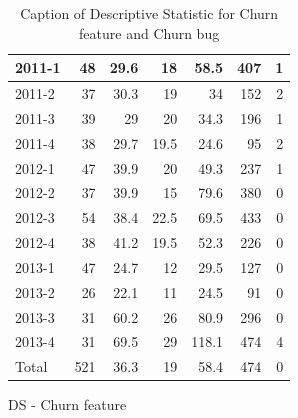 \documentclass[UKenglish]{ifimaster}  %
\begin{document}
\begin{appendices}
\begin{table}[!htbp]
\begin{adjustwidth}{-1.5cm}{}
\begin{subfigure}[b]{0.3\textwidth}
{\begin{tabular}{ | l | r | r | r | r | r | r | }
 2011-1  & 48 & 29.6 & 18 & 58.5 & 407 & 1 \\ \hline
 2011-2  & 37 & 30.3 & 19 & 34 & 152 & 2 \\ \hline
 2011-3  & 39 & 29 & 20 & 34.3 & 196 & 1 \\ \hline
 2011-4  & 38 & 29.7 & 19.5 & 24.6 & 95 & 2 \\ \hline
 2012-1  & 47 & 39.9 & 20 & 49.3 & 237 & 1 \\ \hline
 2012-2  & 37 & 39.9 & 15 & 79.6 & 380 & 0\\ \hline
 2012-3  & 54 & 38.4 & 22.5 & 69.5 & 433 & 0\\ \hline
 2012-4  & 38 & 41.2 & 19.5 & 52.3 & 226 & 0\\ \hline
 2013-1  & 47 & 24.7 & 12 & 29.5 & 127 & 0\\ \hline
 2013-2  & 26 & 22.1 & 11 & 24.5 & 91 & 0\\ \hline
 2013-3  & 31 & 60.2 & 26 & 80.9 & 296 & 0\\ \hline
 2013-4  & 31 & 69.5 & 29 & 118.1 & 474 & 4 \\ \hline
 Total  & 521 & 36.3 & 19 & 58.4 & 474 & 0\\ \hline
\end{tabular}
}
\caption{DS - Churn feature}
 \label{DS:CB:2}
\end{subfigure}
\end{adjustwidth}
\caption[Optional caption for list of figures]{Caption of Descriptive Statistic for Churn feature and Churn bug }
\label{DS:2:4}
\end{table}






\end{appendices}
\end{document}
